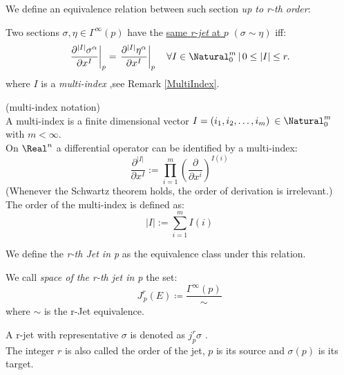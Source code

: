 \documentclass[Main]{subfiles}
\begin{document}
			We define an equivalence relation between such section \emph{up to r-th order}:
			\begin{definition}
				Two sections $\sigma, \eta \in \Gamma^\infty(p)$ have the \underline{same \emph{r-jet} at $p$} $(\sigma \sim \eta)$ iff:
				\begin{displaymath}
					\left.\frac{\partial^{|I|} \sigma^{\alpha}}{\partial x^{I}}\right|_{p} = \left.\frac{\partial^{|I|} \eta^{\alpha}}{\partial x^{I}}\right|_{p} \quad \forall I\in \Natural^m_0 \, \vert \, 0 \leq |I| \leq r.
				\end{displaymath}	
				where $I$ is a \emph{multi-index} ,see Remark \ref{MultiIndex}.	
		\end{definition}
		\begin{remark}\label{MultiIndex}
			(multi-index notation)
			\\
			A multi-index is a %
			finite dimensional vector  $I=(i_1, i_2, \ldots, i_m)\: \in \Natural^m_0$ with $m<\infty$.
			\\
			On $\Real^n$ a differential operator can be identified by a multi-index:
			\begin{displaymath}
				\frac{\partial^{|I|}}{\partial x^{I}} := \prod_{i=1}^{m} \left( \frac{\partial}{\partial x^{i}} \right)^{I(i)}
			\end{displaymath}
			(Whenever the Schwartz theorem holds, the order of derivation is irrelevant.)
			\\
			The order of the multi-index is defined as:
			\begin{displaymath}
				|I| := \sum_{i=1}^{m} I(i)
			\end{displaymath}
		\end{remark}
	
		We define the \emph{r-th Jet in p} as the equivalence class under this relation.
		\begin{definition}
			We call \emph{space of the r-th jet in p} the set:
			\begin{displaymath}
				J^r_{\,p}(E) \coloneqq \frac{\Gamma^\infty(p)}{\sim}
			\end{displaymath}
			where $\sim$ is the r-Jet equivalence.
		\end{definition}
		\begin{notationfix} 
			A r-jet with representative $\sigma$ is denoted as $j^r_p\sigma$ . 
			\\
			The integer $r$ is also called the order of the jet, $p$ is its source and $\sigma(p)$ is its target.
		\end{notationfix}
	
\end{document}
